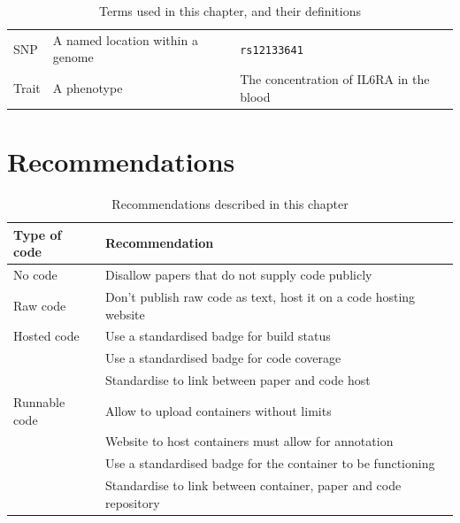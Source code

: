 \begin{table}[h]
\begin{tabular}{|l|p{5cm}|p{5cm}|}
    SNP          & A named location within a genome                                             & \verb|rs12133641|                                               \\
    Trait        & A phenotype                                                                  & The concentration of IL6RA in the blood                         \\
    \hline
  \end{tabular}
  \caption{Terms used in this chapter, and their definitions}
  \label{tab:definitions}
\end{table}

\section*{Recommendations}

\begin{table}[h]
  \begin{tabular}{|p{2cm}|l|}
    \hline
    \textbf{Type of code} & \textbf{Recommendation} \\
    \hline
    No code       & Disallow papers that do not supply code publicly \\
    \hline
    Raw code      & Don't publish raw code as text, host it on a code hosting website \\
    \hline
    Hosted code   & Use a standardised badge for build status \\
                  & Use a standardised badge for code coverage \\
                  & Standardise to link between paper and code host \\
    \hline
    Runnable code & Allow to upload containers without limits \\
                  & Website to host containers must allow for annotation \\
                  & Use a standardised badge for the container to be functioning  \\
                  & Standardise to link between container, paper and code repository \\
    \hline
  \end{tabular}
  \caption{Recommendations described in this chapter}
  \label{tab:recommendations}
\end{table}


\fi
